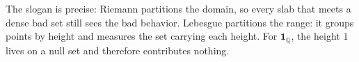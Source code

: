 \begin{remark*}[Interpretation]
The slogan is precise: Riemann partitions the domain, so every slab that meets
a dense bad set still sees the bad behavior. Lebesgue partitions the range:
it groups points by height and measures the set carrying each height. For
\(\mathbf 1_{\mathbb Q}\), the height \(1\) lives on a null set and therefore
contributes nothing.
\end{remark*}



